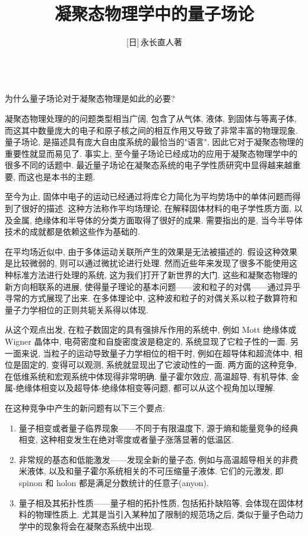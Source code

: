 \documentclass[b5paper]{book}
\title{\bf{凝聚态物理学中的量子场论}}
\author{[日]\,永长直人\quad 著}
\date{}
\begin{document}
\maketitle
{\frontmatter
{}\\

为什么量子场论对于凝聚态物理是如此的必要?

凝聚态物理处理的的问题类型相当广阔, 包含了从气体, 液体, 到固体与等离子体, 而这其中数量庞大的电子和原子核之间的相互作用又导致了非常丰富的物理现象. 量子场论, 是描述具有庞大自由度系统的最恰当的"语言", 因此它对于凝聚态物理的重要性就显而易见了. 事实上, 至今量子场论已经成功的应用于凝聚态物理学中的很多不同的话题中. 最近量子场论在凝聚态系统的电子学性质研究中显得越来越重要, 而这也是本书的主题.

至今为止, 固体中电子的运动已经通过将库仑力简化为平均势场中的单体问题而得到了很好的描述. 这种方法称作平均场理论, 在解释固体材料的电子学性质方面, 以及金属, 绝缘体和半导体的分类方面取得了很好的成果. 需要指出的是, 当今半导体技术的成就都是依赖这些作为基础的.

在平均场近似中, 由于多体运动关联所产生的效果是无法被描述的. 假设这种效果是比较微弱的, 则可以通过微扰论进行处理. 然而近些年来发现了很多不能使用这种标准方法进行处理的系统, 这为我们打开了新世界的大门. 这些和凝聚态物理的新方向相联系的进展, 使得量子理论的基本问题------波和粒子的对偶------通过异乎寻常的方式展现了出来. 在多体理论中, 这种波和粒子的对偶关系以粒子数算符和量子力学相位的正则共轭关系得以体现.

从这个观点出发, 在粒子数固定的具有强排斥作用的系统中, 例如 Mott 绝缘体或 Wigner 晶体中, 电荷密度和自旋密度波是稳定的, 系统显现了它粒子性的一面. 另一面来说, 当粒子的运动导致量子力学相位的相干时, 例如在超导体和超流体中, 相位是固定的, 变得可以观测, 系统就显现出了它波动性的一面. 两方面的这种竞争, 在低维系统和宏观系统中体现得非常明确. 量子霍尔效应, 高温超导, 有机导体, 金属-绝缘体相变以及超导体-绝缘体相变等问题, 都可以从这个视角加以理解.

在这种竞争中产生的新问题有以下三个要点:
\begin{enumerate}
  \item{量子相变或者量子临界现象------不同于有限温度下, 源于熵和能量竞争的经典相变, 这种相变发生在绝对零度或者量子涨落显著的低温区.}
  \item{非常规的基态和低能激发------发现全新的量子态, 例如与高温超导相关的非费米液体, 以及和量子霍尔系统相关的不可压缩量子液体. 它们的元激发, 即 spinon 和 holon 都是满足分数统计的任意子(anyon).}
  \item{量子相及其拓扑性质------量子相的拓扑性质, 包括拓扑缺陷等, 会体现在固体材料的物理性质上. 尤其是当引入某种加了限制的规范场之后, 类似于量子色动力学中的现象将会在凝聚态系统中出现. }
\end{enumerate}

}
\end{document}
